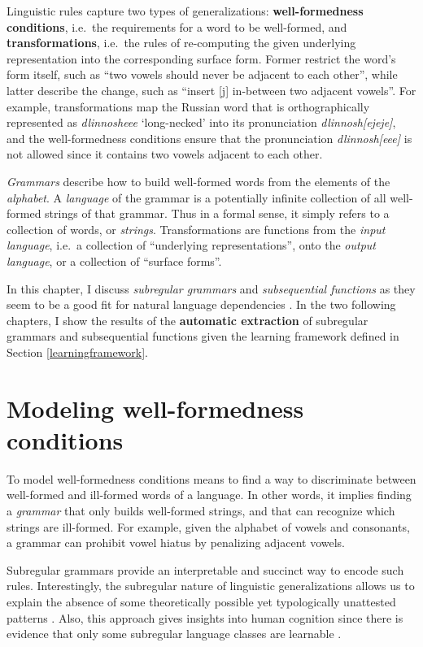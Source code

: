 Linguistic rules capture two types of generalizations: \textbf{well-formedness conditions}, i.e.\ the requirements for a word to be well-formed, and \textbf{transformations}, i.e.\ the rules of re-computing the given underlying representation into the corresponding surface form.
Former restrict the word's form itself, such as ``two vowels should never be adjacent to each other'', while latter describe the change, such as ``insert {[}j{]} in-between two adjacent vowels''.
For example, transformations map the Russian word that is orthographically represented as \emph{dlinnosheee} `long-necked' into its pronunciation \emph{dlinnosh[ejeje]}, and the well-formedness conditions ensure that the pronunciation \emph{dlinnosh[eee]} is not allowed since it contains two vowels adjacent to each other.


\emph{Grammars} describe how to build well-formed words from the elements of the \emph{alphabet}.
A \emph{language} of the grammar is a potentially infinite collection of all well-formed strings of that grammar.
Thus in a formal sense, it simply refers to a collection of words, or \emph{strings}.
Transformations are functions from the \emph{input language}, i.e.\ a collection of ``underlying representations'', onto the \emph{output language}, or a collection of ``surface forms''.


In this chapter, I discuss \emph{subregular grammars} and \emph{subsequential functions} as they seem to be a good fit for natural language dependencies \citep[i.a.]{Heinz11part1,HeinzRawal11,GainorLai12,Heinz-Lai-2013-VHS,AksenovaEtAl16,Graf17CLSpres,ChandleeHeinz2018}.
In the two following chapters, I show the results of the \textbf{automatic extraction} of subregular grammars and subsequential functions given the learning framework defined in Section \ref{learningframework}.


\section{Modeling well-formedness conditions}

To model well-formedness conditions means to find a way to discriminate between well-formed and ill-formed words of a language.
In other words, it implies finding a \emph{grammar} that only builds well-formed strings, and that can recognize which strings are ill-formed.
For example, given the alphabet of vowels and consonants, a grammar can prohibit vowel hiatus by penalizing adjacent vowels.

Subregular grammars provide an interpretable and succinct way to encode such rules.
Interestingly, the subregular nature of linguistic generalizations allows us to explain the absence of some theoretically possible yet typologically unattested patterns \citep{GainorLai12}.
Also, this approach gives insights into human cognition since there is evidence that only some subregular language classes are learnable \citep{Lai15}.

